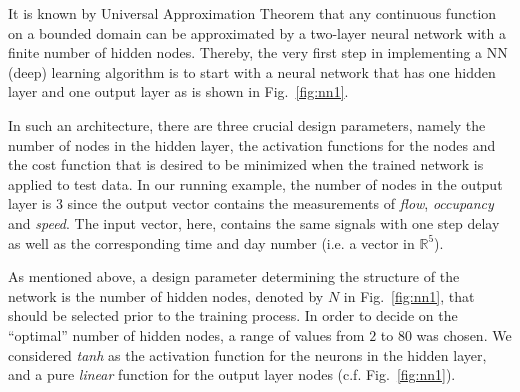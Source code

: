\documentclass[twocolumn,10pt]{asme2e}
\begin{document}
It is known by Universal Approximation Theorem  \cite{universality} that any continuous function on a bounded domain can be approximated by a two-layer neural network with a finite number of hidden nodes. Thereby, the very first step in implementing a NN (deep) learning algorithm is to start with a neural network that has one hidden layer and one output layer as is shown in Fig.~\ref{fig:nn1}. 

In such an architecture, there are three crucial design parameters, namely the number of nodes in the hidden layer, the activation functions for the nodes and the cost function that is desired to be minimized when the trained network is applied to test data. In our running example, the number of nodes in the output layer is 3 since the output vector contains the measurements of \emph{flow}, \emph{occupancy} and \emph{speed}. The input vector, here, contains the same signals with one step delay as well as the corresponding time and day number (i.e. a vector in $\mathbb{R}^5$). 

As mentioned above, a design parameter determining the structure of the network is the number of hidden nodes, denoted by $N$ in Fig.~\ref{fig:nn1}, that should be selected prior to the training process. In order to decide on the ``optimal'' number of hidden nodes, a range of values from $2$ to $80$ was chosen. We considered \emph{tanh} as the activation function for the neurons in the hidden layer, and a pure \emph{linear} function for the output layer nodes (c.f. Fig.~\ref{fig:nn1}). 
\end{document}
